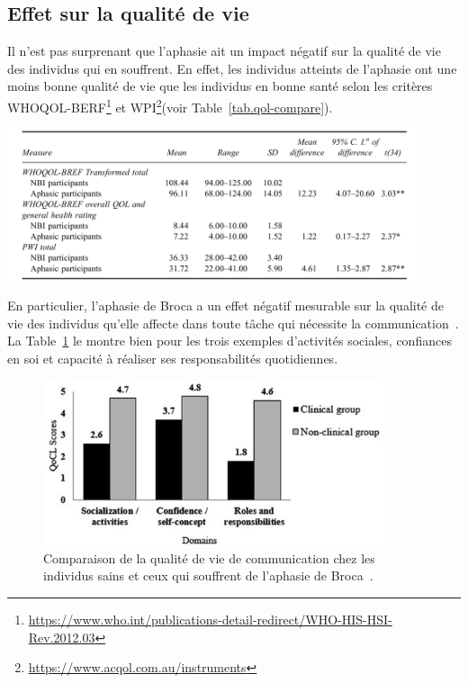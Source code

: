 \subsection{Effet sur la qualité de vie}

Il n'est pas surprenant que l'aphasie ait un impact négatif sur la qualité de vie des individus qui en souffrent.
En effet, les individus atteints de l'aphasie ont une moins bonne qualité de vie que les individus en bonne santé
selon les critères WHOQOL-BERF\footnote{\url{https://www.who.int/publications-detail-redirect/WHO-HIS-HSI-Rev.2012.03}} 
et WPI\footnote{\url{https://www.acqol.com.au/instruments}}(voir Table~\ref{tab.qol-compare}).

\begin{table}[hbt]
    \centering
    \includegraphics[width=12cm]{assets/images/qol.png}
    \caption[Comparaison de la qualité de vie chez les individus sains et ceux qui souffrent d'une aphasie.]%
    {Comparaison de la qualité de vie chez les individus sains et ceux qui souffrent d'une aphasie~\cite{Ross_Wertz_2010}.}
    \label{tab.qol-compare}
\end{table}

En particulier, l'aphasie de Broca a un effet négatif mesurable sur la qualité de vie des individus qu'elle affecte
dans toute tâche qui nécessite la communication~\cite{Pallavi_Perumal_Krupa_2018}. 
La Table~\ref{fig.qocl-compare} le montre bien pour les trois exemples d'activités sociales, confiances en soi
et capacité à réaliser ses responsabilités quotidiennes.

\begin{figure}[hbt]
    \centering
    \includegraphics[width=10cm]{assets/images/qocl.png}
    \caption[Comparaison de la qualité de vie de communication chez les individus sains et ceux qui souffrent de l'aphasie de Broca.]%
    {Comparaison de la qualité de vie de communication chez les individus sains et ceux qui souffrent de l'aphasie de Broca~\cite{Pallavi_Perumal_Krupa_2018}.}
    \label{fig.qocl-compare}
\end{figure}

